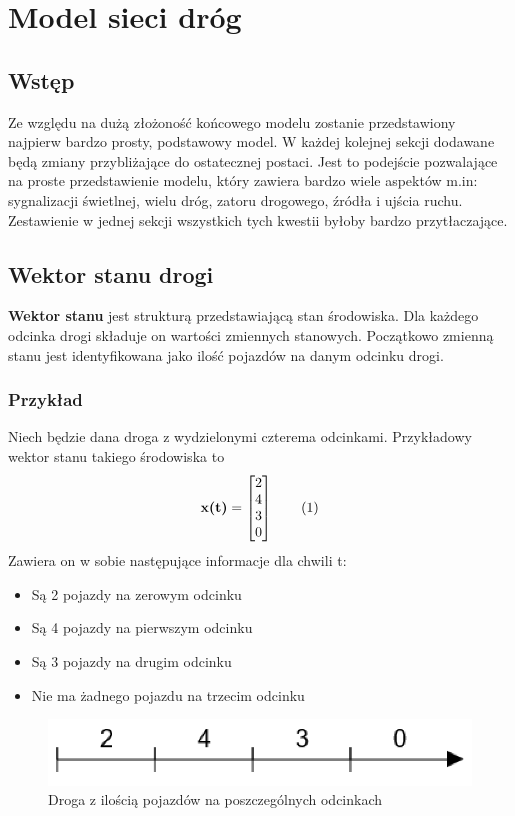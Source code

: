 \documentclass[12pt]{book}
\theoremstyle{plain}
\newcommand\addtag{\refstepcounter{equation}
\renewcommand{\labelenumii}{\theenumii}
\renewcommand{\theenumii}{\theenumi.\arabic{enumii}.}
\tag{\theequation}}
\begin{document}
\chapter{Model sieci dróg} \label{chapter:model_sieci_drog}
\section{Wstęp}
Ze względu na dużą złożoność końcowego modelu zostanie przedstawiony najpierw bardzo prosty, podstawowy model. W każdej kolejnej sekcji dodawane będą zmiany przybliżające do ostatecznej postaci. Jest to podejście pozwalające na proste przedstawienie modelu, który zawiera bardzo wiele aspektów m.in:
sygnalizacji świetlnej, wielu dróg, zatoru drogowego, źródła i ujścia ruchu. Zestawienie w jednej sekcji wszystkich tych kwestii byłoby bardzo przytłaczające.

\section{Wektor stanu drogi} \label{sec:wektor_stanu_drogi}
\textbf{Wektor stanu} jest strukturą przedstawiającą stan środowiska. Dla każdego odcinka drogi składuje on wartości zmiennych stanowych. Początkowo zmienną stanu jest identyfikowana jako ilość pojazdów na danym odcinku drogi. 
\subsection{Przykład} \label{subsec:example-single-road}
Niech będzie dana droga z wydzielonymi czterema odcinkami. Przykładowy wektor stanu takiego środowiska to
\[\textbf{x(t)}=\begin{bmatrix}
2 \\ 4 \\ 3 \\ 0
\end{bmatrix} \addtag \]
Zawiera on w sobie następujące informacje dla chwili t:
\begin{itemize}
	\item Są 2 pojazdy na zerowym odcinku
	\item Są 4 pojazdy na pierwszym odcinku
	\item Są 3 pojazdy na drugim odcinku
	\item Nie ma żadnego pojazdu na trzecim odcinku
\end{itemize}

\begin{figure}[H]
	\centering
	\includegraphics[width=14cm]{images/1_droga_4_odcinki}
	\caption{Droga z ilością pojazdów na poszczególnych odcinkach}
	\label{fig:single_road}
\end{figure}
\end{document}
